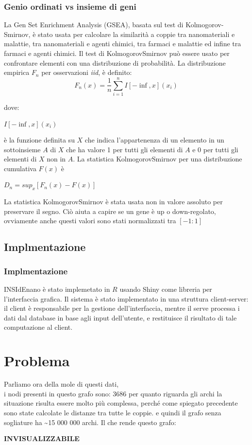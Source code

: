 \documentclass{beamer}
\begin{document}
\begin{frame}
\frametitle{Genio ordinati vs insieme di geni}
La Gen Set Enrichment Analysis (GSEA), basata sul test di Kolmogorov-Smirnov, è stato usata per calcolare la similarità a coppie tra nanomateriali e malattie, tra nanomateriali e agenti chimici, tra farmaci e malattie ed infine tra farmaci e agenti chimici. Il test di KolmogorovSmirnov può essere usato per confrontare elementi con una distribuzione di probabilità. La distribuzione empirica $F_n$ per osservazioni \textit{iid}, è definito:
\begin{equation}
F_n(x) = \frac{1}{n} \sum\limits_{i=1}^n I[-\inf,x](x_i)
\end{equation}
\end{frame}

\begin{frame}
dove:
\begin{center}
$I[-\inf,x](x_i)$
\end{center}
è la funzione definita su $X$ che indica l'appartenenza di un elemento in un sottoinsieme $A$ di $X$ che ha valore 1 per tutti gli elementi di $A$ e 0 per tutti gli elementi di $X$ non in $A$. La statistica KolmogorovSmirnov per una distribuzione cumulativa $F(x)$ è 
\begin{center}
$D_n = sup_x[F_n(x)- F(x)]$
\end{center}
La statistica KolmogorovSmirnov è stata usata non in valore assoluto per preservare il segno. Ciò aiuta a capire se un gene è up o down-regolato, ovviamente anche questi valori sono stati normalizzati tra $[-1:1]$
\end{frame}

\subsection{Implmentazione}
\begin{frame}
\frametitle{Implmentazione}
INSIdEnano è stato implemetato in $R$ usando Shiny come libreria per l'interfaccia grafica. Il sistema è stato implementato in una struttura client-server: il client è responsabile per la gestione dell'interfaccia, mentre il serve processa i dati dal database in base agli input dell'utente,  e restituisce il risultato di tale computazione al client.
\end{frame}


\section{Problema}
\begin{frame}
Parliamo ora della mole di questi dati,\\
i nodi presenti in questo grafo sono: 3686
per quanto riguarda gli archi la situazione risulta essere molto più complessa, perché come spiegato precedente sono state calcolate le distanze tra tutte le coppie. e quindi il grafo senza sogliature ha  \textasciitilde 15 000 000 archi.
Il che rende questo grafo:\\
\begin{center}
\textbf{INVISUALIZZABILE}
\end{center}
\end{frame}
\end{document}
